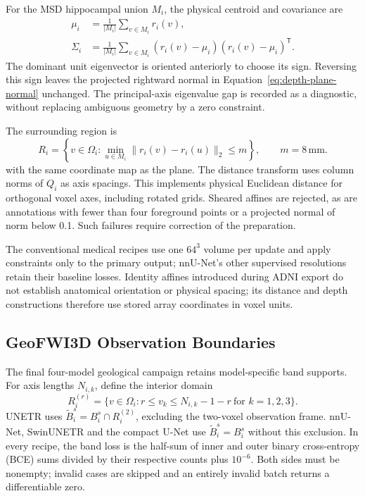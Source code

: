\documentclass[12pt,a4paper]{article}
\begin{document}
For the MSD hippocampal union $M_i$, the physical centroid and covariance are
\begin{equation}
\begin{aligned}
\mu_i&=\frac{1}{|M_i|}\sum_{v\in M_i}r_i(v),\\
\Sigma_i&=\frac{1}{|M_i|}\sum_{v\in M_i}
       (r_i(v)-\mu_i)(r_i(v)-\mu_i)^{\mathsf T}.
\end{aligned}
\label{eq:depth-centroid-covariance}
\end{equation}
The dominant unit eigenvector is oriented anteriorly to choose its
sign. Reversing this sign leaves the projected rightward normal in
Equation~\ref{eq:depth-plane-normal} unchanged. The principal-axis
eigenvalue gap is recorded as a diagnostic, without replacing
ambiguous geometry by a zero constraint.

The surrounding region is
\begin{equation}
R_i=\left\{v\in\Omega_i:
       \min_{u\in M_i}\|r_i(v)-r_i(u)\|_2\leq m\right\},
\qquad m=8\,\mathrm{mm}.
\label{eq:depth-region-of-interest}
\end{equation}
with the same coordinate map as the plane. The distance transform uses
column norms of $Q_i$ as axis spacings. This implements physical
Euclidean distance for orthogonal voxel axes, including rotated grids.
Sheared affines are rejected, as are annotations with fewer than four
foreground points or a projected normal of norm below 0.1. Such
failures require correction of the preparation.

The conventional medical recipes use one $64^3$ volume per update
and apply constraints only to the primary output; nnU-Net's other
supervised resolutions retain their baseline losses. Identity affines
introduced during ADNI export do not establish anatomical orientation
or physical spacing; its distance and depth constructions therefore
use stored array coordinates in voxel units.

\subsection{GeoFWI3D Observation Boundaries}
\label{sec:geo-boundaries}

The final four-model geological campaign retains model-specific band
supports. For axis lengths $N_{i,k}$, define the interior domain
\begin{equation}
R_i^{(r)}=\{v\in\Omega_i:
 r\leq v_k\leq N_{i,k}-1-r\ \text{for }k=1,2,3\}.
\label{eq:geological-band-frame}
\end{equation}
UNETR uses $\widetilde B_i^s=B_i^s\cap R_i^{(2)}$, excluding the
two-voxel observation frame. nnU-Net, SwinUNETR and the compact U-Net
use $\widetilde B_i^s=B_i^s$ without this exclusion. In every recipe,
the band loss is the half-sum of inner and outer binary cross-entropy (BCE) sums divided
by their respective counts plus $10^{-6}$. Both sides must be
nonempty; invalid cases are skipped and an entirely invalid batch
returns a differentiable zero.
\end{document}
